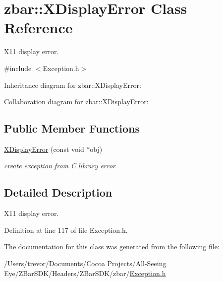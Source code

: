 \hypertarget{classzbar_1_1_x_display_error}{
\section{zbar::XDisplayError Class Reference}
\label{classzbar_1_1_x_display_error}
}


X11 display error.  




{\ttfamily \#include $<$Exception.h$>$}



Inheritance diagram for zbar::XDisplayError:


Collaboration diagram for zbar::XDisplayError:
\subsection*{Public Member Functions}
\begin{DoxyCompactItemize}
\item 
\hypertarget{classzbar_1_1_x_display_error_a27468e7491f93af2f409c6c2c2feaec2}{
\hyperlink{classzbar_1_1_x_display_error_a27468e7491f93af2f409c6c2c2feaec2}{XDisplayError} (const void $\ast$obj)}
\label{classzbar_1_1_x_display_error_a27468e7491f93af2f409c6c2c2feaec2}

\begin{DoxyCompactList}\small\item\em create exception from C library error \end{DoxyCompactList}\end{DoxyCompactItemize}


\subsection{Detailed Description}
X11 display error. 

Definition at line 117 of file Exception.h.



The documentation for this class was generated from the following file:\begin{DoxyCompactItemize}
\item 
/Users/trevor/Documents/Cocoa Projects/All-\/Seeing Eye/ZBarSDK/Headers/ZBarSDK/zbar/\hyperlink{_exception_8h}{Exception.h}\end{DoxyCompactItemize}
